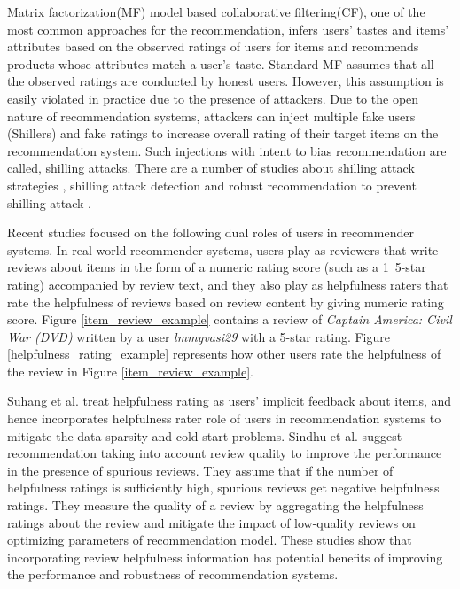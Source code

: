 \documentclass[master,english,final]{kaist-ucs}
\begin{document}
Matrix factorization(MF) model based collaborative filtering(CF), one of the most common approaches for the recommendation, infers users’ tastes and items’ attributes based on the observed ratings of users for items and recommends products whose attributes match a user’s taste.
Standard MF assumes that all the observed ratings are conducted by honest users.
However, this assumption is easily violated in practice due to the presence of attackers.
Due to the open nature of recommendation systems, attackers can inject multiple fake users (Shillers) and fake ratings to increase overall rating of their target items on the recommendation system.
Such injections with intent to bias recommendation are called, shilling attacks.
There are a number of studies about shilling attack strategies , shilling attack detection  and robust recommendation to prevent shilling attack .

Recent studies \cite{DualRole,RQMF} focused on the following dual roles of users in recommender systems.
In real-world recommender systems, users play as reviewers that write reviews about items in the form of a numeric rating score (such as a 1~5-star rating) accompanied by review text, and they also play as helpfulness raters that rate the helpfulness of reviews based on review content by giving numeric rating score.
Figure \ref{item_review_example} contains a review of \textit{Captain America: Civil War (DVD)} written by a user \textit{lmmyvasi29} with a 5-star rating.
Figure \ref{helpfulness_rating_example} represents how other users rate the helpfulness of the review in Figure \ref{item_review_example}.

Suhang et al. \cite{DualRole} treat helpfulness rating as users’ implicit feedback about items, and hence incorporates helpfulness rater role of users in recommendation systems to mitigate the data sparsity and cold-start problems.
Sindhu et al. \cite{RQMF} suggest recommendation taking into account review quality to improve the performance in the presence of spurious reviews.
They assume that if the number of helpfulness ratings is sufficiently high, spurious reviews get negative helpfulness ratings.
They measure the quality of a review by aggregating the helpfulness ratings about the review and mitigate the impact of low-quality reviews on optimizing parameters of recommendation model.
These studies show that incorporating review helpfulness information has potential benefits of improving the performance and robustness of recommendation systems.
\end{document}
